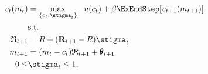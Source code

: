   \begin{equation*}\begin{gathered}\begin{aligned}
        \vFunc_{t}(m_{t})  & = \max_{\{{c}_{t},\stigma_{t}\}}   ~~ \uFunc(c_{t}) +  \DiscFac
        \ExEndStep[{\vFunc}_{t+1}(m_{t+1})]
        \\      & \text{s.t.} \nonumber
        \\      \Rport_{t+1}  & = \Rfree + (\Risky_{t+1}-\Rfree) \stigma_{t}
        \\      m_{t+1}  & = (m_{t}-c_{t})\Rport_{t+1} + \TranShkEmp_{t+1}
        \\  0       \leq & \stigma_{t}  \leq 1, \label{eq:noshorts}
      \end{aligned}\end{gathered}\end{equation*}
